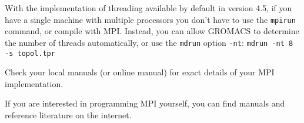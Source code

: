 With the implementation of threading available by default in {\gromacs} version 4.5, 
if you have a single machine with multiple processors you don't have to
use the {\tt mpirun} command, or compile with MPI. Instead, you can allow GROMACS to determine the number of threads automatically, or use the {\tt mdrun} option {\tt -nt}:
{\tt mdrun -nt 8 -s topol.tpr}

Check your local manuals (or online manual) for exact details
of your MPI implementation.

If you are interested in programming MPI yourself, you can find
manuals and reference literature on the internet.



